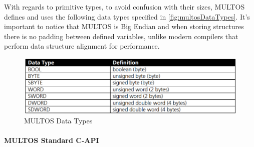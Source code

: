 \hfil


With regards to primitive types, to avoid confusion with their sizes, MULTOS defines and uses the following data types specified in \autoref{fig:multosDataTypes}. It's important to notice that MULTOS is Big Endian
and when storing structures there is no padding between defined variables, unlike modern compilers that perform data structure alignment \citep{dataStructAlign} for performance.

\begin{figure}[bth]
	\begin{center}
		\includegraphics[width=\linewidth]{gfx/multosDataTypes}
	\end{center}
	\caption{MULTOS Data Types}
	\label{fig:multosDataTypes}
\end{figure}


\paragraph{MULTOS Standard C-API}

